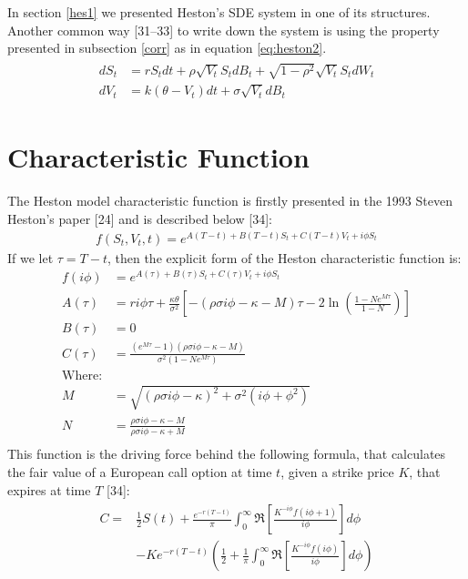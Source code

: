 \documentclass[12pt,twoside]{reedthesis}
\theoremstyle{definition}
\theoremstyle{definition}
\theoremstyle{remark}
\begin{document}
  In section \ref{hes1} we presented Heston's SDE system in one of its
  structures. Another common way {[}31--33{]} to write down the system is
  using the property presented in subsection \ref{corr} as in equation
  \eqref{eq:heston2}.
  \begin{align}
  \label{eq:heston2}
  \begin{split}
  dS_t &= r S_t dt + \rho \sqrt{V_t} S_t dB_t + \sqrt{1 - \rho^2} \sqrt{V_t} S_t dW_t \\
  dV_t &= k(\theta - V_t)dt + \sigma \sqrt{V_t} dB_t 
  \end{split}
  \end{align}
  \section{Characteristic Function}\label{characteristic-function}
  
  The Heston model characteristic function is firstly presented in the
  1993 Steven Heston's paper {[}24{]} and is described below {[}34{]}:
  \begin{align}
  f(S_t, V_t, t) = e^{A(T-t)+B(T-t)S_t + C(T-t)V_t + i \phi S_t}
  \end{align}
  If we let \(\tau = T-t\), then the explicit form of the Heston
  characteristic function is:
  \begin{align*}
  f(i \phi) &= e^{A(\tau)+B(\tau)S_t + C(\tau)V_t + i \phi S_t} \\
  A(\tau) &= r i \phi \tau + \frac{\kappa \theta}{\sigma^2} \left[ - (\rho \sigma i \phi - \kappa - M) \tau - 2 \ln\left(\frac{1-N e^{M \tau}}{1-N}\right) \right] \\
  B(\tau) &= 0 \\
  C(\tau) &= \frac{(e^{M \tau}-1)(\rho \sigma i \phi - \kappa - M)}{\sigma^2 (1-N e^{M \tau})} \\
  \text{Where:} & \\
  M &= \sqrt{(\rho \sigma i \phi - \kappa)^2 + \sigma^2 (i \phi + \phi^2)} \\
  N &= \frac{\rho \sigma i \phi - \kappa - M}{\rho \sigma i \phi - \kappa + M} \\
  \end{align*}
  This function is the driving force behind the following formula, that
  calculates the fair value of a European call option at time \(t\), given
  a strike price \(K\), that expires at time \(T\) {[}34{]}:
  \begin{align} 
  \label{eq:cfheston}
  \begin{split}
  C = & \frac{1}{2} S(t) + \frac{e^{-r(T-t)}}{\pi}\int_{0}^{\infty}{\Re \left[ \frac{K^{-i \phi} f(i \phi + 1)}{i \phi} \right] d\phi} \\
  & -Ke^{-r(T-t)}\left( \frac{1}{2} + \frac{1}{\pi} \int_{0}^{\infty}{\Re \left[ \frac{K^{-i \phi} f(i \phi)}{i \phi} \right]}  d\phi \right)
  \end{split}
  \end{align}
\end{document}
